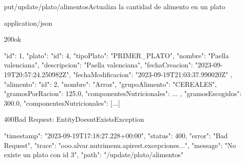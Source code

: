 \begin{apiRoute}{put}{/update/plato/alimentos}{Actualiza la cantidad de alimento en un plato}
	\begin{routeParameter}
	\end{routeParameter}
	
	\begin{routeResponse}{application/json}
		\begin{routeResponseItem}{200}{ok}
			\begin{routeResponseItemBody}
{
    "id": 1,
    "plato": {
        "id": 4,
        "tipoPlato": "PRIMER_PLATO",
        "nombre": "Paella valenciana",
        "descripcion": "Paella valenciana",
        "fechaCreacion": "2023-09-19T20:57:24.250982Z",
        "fechaModificacion": "2023-09-19T21:03:37.990020Z"
    },
    "alimento": {
        "id": 2,
        "nombre": "Arroz",
        "grupoAlimento": "CEREALES",
        "gramosPorRacion": 125.0,
        "componentesNutricionales": {...}
    },
    "gramosEscogidos": 300.0,
    "componentesNutricionales": [...]	
}
    		\end{routeResponseItemBody}
		\end{routeResponseItem}
		\begin{routeResponseItem}{400}{Bad Request: EntityDoesntExistsException}
			\begin{routeResponseItemBody}
{
    "timestamp": "2023-09-19T17:18:27.228+00:00",
    "status": 400,
    "error": "Bad Request",
    "trace": "ooo.alvar.nutrimenu.apirest.excepciones...",
    "message": "No existe un plato con id 3",
    "path": "/update/plato/alimentos"
}
			\end{routeResponseItemBody}
		\end{routeResponseItem}
	\end{routeResponse}
\end{apiRoute}

